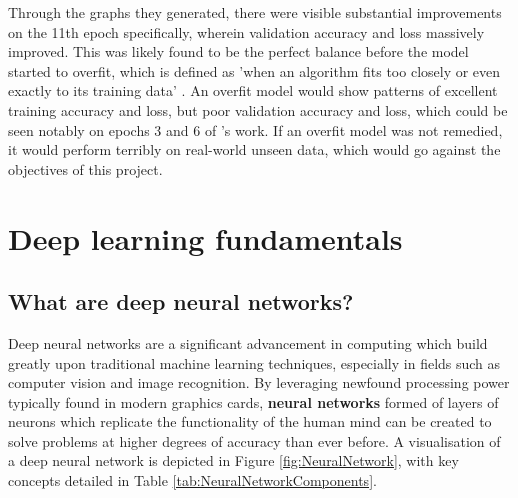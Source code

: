 \documentclass[12pt]{report}
\begin{document}
\noindent Through the graphs they generated, there were visible substantial improvements on the 11th epoch specifically, wherein validation 
accuracy and loss massively improved. This was likely found to be the perfect balance before the model started to overfit, which is defined 
as 'when an algorithm fits too closely or even exactly to its training data' \autocite{ibmWhatOverfittingIBM2021}. An overfit model would 
show patterns of excellent training accuracy and loss, but poor validation accuracy and loss, which could be seen notably on epochs 3 and 6
of \textcite{mathurPneumoniaDetectionUsing2020}'s work. If an overfit model was not remedied, it would perform terribly on real-world unseen 
data, which would go against the objectives of this project.  


\chapter{Deep learning fundamentals}




\section{What are deep neural networks?}
Deep neural networks are a significant advancement in computing which build greatly upon traditional 
machine learning techniques, especially in fields such as computer vision and image recognition. By leveraging newfound processing power 
typically found in modern graphics cards, \textbf{neural networks} formed of layers of neurons which replicate the functionality of 
the human mind can be created to solve problems at higher degrees of accuracy than ever before. A visualisation of a deep neural network 
is depicted in Figure \ref{fig:NeuralNetwork}, with key concepts detailed in Table \ref{tab:NeuralNetworkComponents}.
\end{document}
